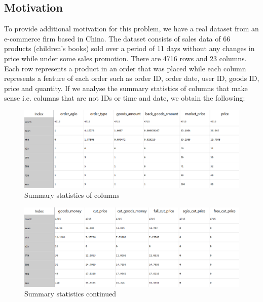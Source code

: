 \documentclass[a4paper]{article}
\begin{document}
\subsection{Motivation}
To provide additional motivation for this problem, we have a real dataset from an e-commerce firm based in China. The dataset consists of sales data of 66 products (children's books) sold over a period of 11 days without any changes in price while under some sales promotion. There are 4716 rows and 23 columns. Each row represents a product in an order that was placed while each column represents a feature of each order such as order ID, order date, user ID, goods ID, price and quantity.
\newline
\newline
If we analyse the summary statistics of columns that make sense i.e. columns that are not IDs or time and date, we obtain the following:
\begin{figure}[h]
	\centering
	\includegraphics[width=1.1\textwidth]{data1.png}
	\caption{\label{fig:data1}Summary statistics of columns}
\end{figure}
\begin{figure}[h]
	\centering
	\includegraphics[width=1.05\textwidth]{data2.png}
	\caption{\label{fig:data2}Summary statistics continued}
\end{figure}
\newline
\newline
\end{document}

